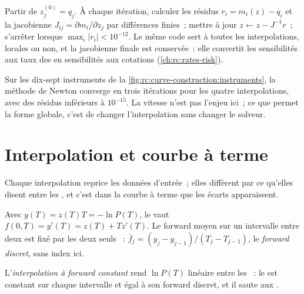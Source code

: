 \begin{method}\label{met:rc:curve-construction:newton}
Partir de $z^{(0)}_j=q_j$. À chaque itération, calculer les résidus $r_i = m_i(z)
- q_i$ et la jacobienne $J_{ij}=\partial m_i/\partial z_j$ par
différences finies~; mettre à jour $z \leftarrow z - J^{-1}r$~; s'arrêter lorsque $\max_i|r_i|<10^{-12}$.
Le même code sert à toutes les interpolations, locales ou non, et la jacobienne
finale est conservée~: elle convertit les sensibilités aux taux des  en
sensibilités aux cotations (\cref{ch:rc:rates-risk}).
\end{method}

\label{lst:rc:curve-construction:calibrate}

Sur les dix-sept instruments de la \cref{fig:rc:curve-construction:instruments},
la méthode de Newton converge en trois itérations pour les quatre interpolations,
avec des résidus inférieurs à $10^{-15}$. La vitesse n'est pas l'enjeu ici~; ce
que permet la forme globale, c'est de changer l'interpolation sans changer le solveur.

\section{Interpolation et courbe à terme}

Chaque interpolation reprice les données d'entrée~; elles diffèrent par ce qu'elles
disent entre les , et c'est dans la courbe à terme que les écarts apparaissent.

\begin{proposition}\label{prop:rc:curve-construction:fwd}
Avec $y(T) = z(T)T = -\ln P(T)$, le  vaut $f(0,T) =
y'(T) = z(T) + T z'(T)$. Le forward moyen sur un intervalle entre deux  est fixé par
les deux seuls ~: $\bar f_j = (y_j - y_{j-1})/(T_j-T_{j-1})$, le
\emph{forward discret}, sans index ici.
\end{proposition}

\begin{definition}\label{def:rc:curve-construction:flatfwd}
L'\emph{interpolation à forward constant} rend
$\ln P(T)$ linéaire entre les ~: le  est constant sur
chaque intervalle et égal à son forward discret, et il saute aux .
\end{definition}

